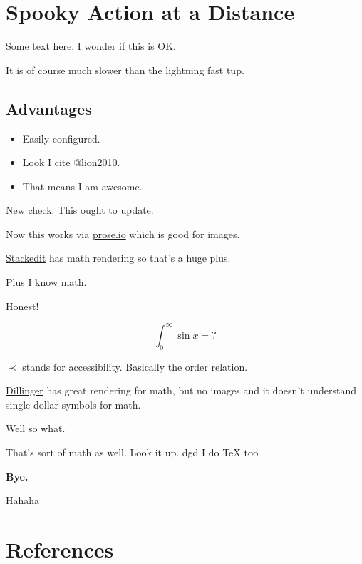 \documentclass[]{article}
\date{}
\providecommand{\tightlist}{%
  \setlength{\itemsep}{0pt}\setlength{\parskip}{0pt}}
\begin{document}
\hypertarget{spooky-action-at-a-distance}{%
\section{Spooky Action at a
Distance}\label{spooky-action-at-a-distance}}

Some text here. I wonder if this is OK.

It is of course much slower than the lightning fast tup.

\hypertarget{advantages}{%
\subsection{Advantages}\label{advantages}}

\begin{itemize}
\tightlist
\item
  Easily configured.
\item
  Look I cite @lion2010.
\item
  That means I am awesome.
\end{itemize}

New check. This ought to update.

Now this works via \href{http://prose.io}{prose.io} which is good for
images.

\href{https://stackedit.io}{Stackedit} has math rendering so that's a
huge plus.

Plus I know math.

Honest!

\[\int_0^\infty\sin{x} = ?\]

\(\prec\) stands for accessibility. Basically the order relation.

\href{https://dillinger.io/}{Dillinger} has great rendering for math,
but no images and it doesn't understand single dollar symbols for math.

Well so what.

That's sort of math as well. Look it up. dgd I do TeX too

\textbf{Bye.}

Hahaha

\hypertarget{references}{%
\section{References}\label{references}}
\end{document}
